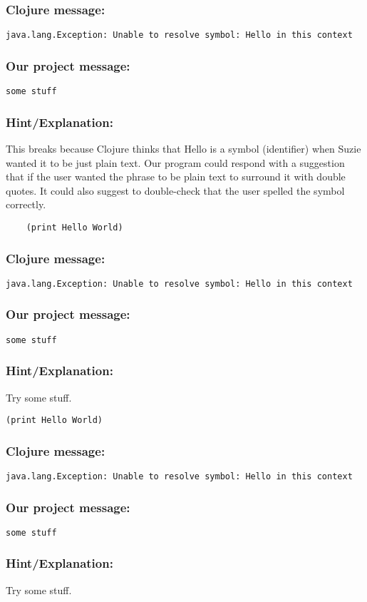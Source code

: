 \documentclass[12pt]{article}
\begin{document}
{\addtolength{\leftskip}{10mm}
\subsubsection*{Clojure message:}
\verb|java.lang.Exception: Unable to resolve symbol: Hello in this context|

\subsubsection*{Our project message:}
\verb|some stuff|
\subsubsection*{Hint/Explanation:}

This breaks because Clojure thinks that Hello is a symbol (identifier) when Suzie wanted it to be just plain text. Our program could respond with a suggestion that if the user wanted the phrase to be plain text to surround it with double quotes. It could also suggest to double-check that the user spelled the symbol correctly.

}

\begin{verbatim}
	(print Hello World)
\end{verbatim}

{\addtolength{\leftskip}{10mm}
\subsubsection*{Clojure message:}
\verb|java.lang.Exception: Unable to resolve symbol: Hello in this context|

\subsubsection*{Our project message:}
\verb|some stuff|
\subsubsection*{Hint/Explanation:}

Try some stuff.

}

\verb|(print Hello World)|

{\addtolength{\leftskip}{10mm}
\subsubsection*{Clojure message:}
\verb|java.lang.Exception: Unable to resolve symbol: Hello in this context|

\subsubsection*{Our project message:}
\verb|some stuff|
\subsubsection*{Hint/Explanation:}

Try some stuff.

}
\end{document}
